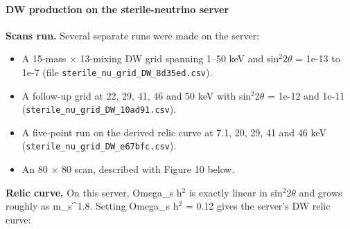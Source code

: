 \documentclass[11pt,a4paper]{article}
\begin{document}
\paragraph{DW production on the sterile-neutrino server}
\textbf{Scans run.} Several separate runs were made on the server:

\begin{itemize}
  \item A 15-mass $\times$ 13-mixing DW grid spanning 1--50 keV and sin$^2$2$\theta$ = 1e-13 to 1e-7 (file \texttt{sterile\_\allowbreak{}nu\_\allowbreak{}grid\_\allowbreak{}DW\_\allowbreak{}8d35ed.csv}).
  \item A follow-up grid at 22, 29, 41, 46 and 50 keV with sin$^2$2$\theta$ = 1e-12 and 1e-11 (\texttt{sterile\_\allowbreak{}nu\_\allowbreak{}grid\_\allowbreak{}DW\_\allowbreak{}10ad91.csv}).
  \item A five-point run on the derived relic curve at 7.1, 20, 29, 41 and 46 keV (\texttt{sterile\_\allowbreak{}nu\_\allowbreak{}grid\_\allowbreak{}DW\_\allowbreak{}e67bfc.csv}).
  \item An 80 $\times$ 80 scan, described with Figure 10 below.
\end{itemize}
\textbf{Relic curve.} On this server, Omega\_s h$^2$ is exactly linear in sin$^2$2$\theta$ and grows roughly as m\_s\textasciicircum{}1.8. Setting Omega\_s h$^2$ = 0.12 gives the server's DW relic curve:
\end{document}
